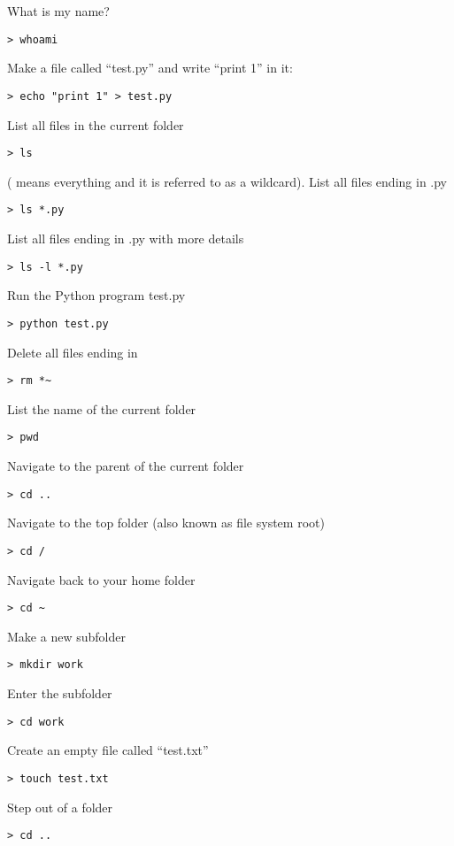 \documentclass[justified,sixbynine]{tufte-book}
\def\ft{\small\tt}
\theoremstyle{plain}%
\theoremstyle{definition}
\theoremstyle{remark}
\begin{document}
\begin{fullwidth}
\noindent What is my name?
\begin{lstlisting}
> whoami
\end{lstlisting}
\noindent Make a file called ``test.py'' and write ``print 1'' in it:
\begin{lstlisting}
> echo "print 1" > test.py
\end{lstlisting}
\noindent List all files in the current folder
\begin{lstlisting}
> ls
\end{lstlisting}
({\ft *} means everything and it is referred to as a wildcard).
\noindent List all files ending in .py
\begin{lstlisting}
> ls *.py
\end{lstlisting}
\noindent List all files ending in .py with more details
\begin{lstlisting}
> ls -l *.py
\end{lstlisting}
\noindent Run the Python program test.py
\begin{lstlisting}
> python test.py
\end{lstlisting}
\noindent Delete all files ending in ~
\begin{lstlisting}
> rm *~
\end{lstlisting}
\noindent List the name of the current folder
\begin{lstlisting}
> pwd
\end{lstlisting}
\noindent Navigate to the parent of the current folder
\begin{lstlisting}
> cd ..
\end{lstlisting}
\noindent Navigate to the top folder (also known as file system root)
\begin{lstlisting}
> cd /
\end{lstlisting}
\noindent Navigate back to your home folder
\begin{lstlisting}
> cd ~
\end{lstlisting}
\noindent Make a new subfolder
\begin{lstlisting}
> mkdir work
\end{lstlisting}
\noindent Enter the subfolder
\begin{lstlisting}
> cd work
\end{lstlisting}
\noindent Create an empty file called ``test.txt''
\begin{lstlisting}
> touch test.txt
\end{lstlisting}
\noindent Step out of a folder
\begin{lstlisting}
> cd ..
\end{lstlisting}

\end{fullwidth}
\end{document}
